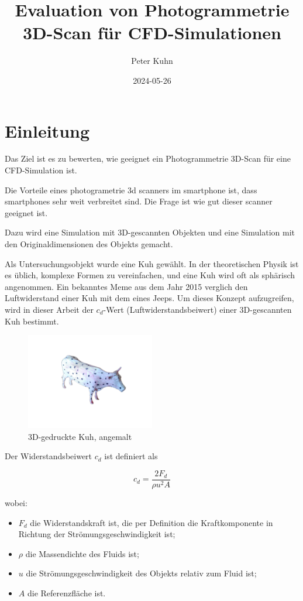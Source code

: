 \documentclass[a4paper,12pt]{article}
\title{Evaluation von Photogrammetrie 3D-Scan für CFD-Simulationen}
\author{Peter Kuhn}
\date{2024-05-26}
\begin{document}
\maketitle

\tableofcontents

\section{Einleitung}\label{sec:Einleitung}
Das Ziel ist es zu bewerten, wie geeignet ein Photogrammetrie 3D-Scan für eine CFD-Simulation ist.

Die Vorteile eines photogrametrie 3d scanners im smartphone ist, dass smartphones sehr weit verbreitet sind. Die Frage ist wie gut dieser scanner geeignet ist.

Dazu wird eine Simulation mit 3D-gescannten Objekten und eine Simulation mit den Originaldimensionen des Objekts gemacht.

Als Untersuchungsobjekt wurde eine Kuh gewählt. In der theoretischen Physik ist es üblich, komplexe Formen zu vereinfachen, und eine Kuh wird oft als sphärisch angenommen. Ein bekanntes Meme aus dem Jahr 2015 verglich den Luftwiderstand einer Kuh mit dem eines Jeeps. Um dieses Konzept aufzugreifen, wird in dieser Arbeit der \( c_d \)-Wert (Luftwiderstandsbeiwert) einer 3D-gescannten Kuh bestimmt.
\newpage

\begin{figure}[h]
    \centering
    \includegraphics[width=0.5\textwidth]{signal-2024-05-26-124612.png}
    \caption{3D-gedruckte Kuh, angemalt}
    \label{fig:cowObj}
\end{figure}

Der Widerstandsbeiwert \( c_d \) ist definiert als

\begin{equation}
c_d = \frac{2 F_d}{\rho u^2 A}
\end{equation}

wobei:
\begin{itemize}
    \item \( F_d \) die Widerstandskraft ist, die per Definition die Kraftkomponente in Richtung der Strömungsgeschwindigkeit ist;
    \item \( \rho \) die Massendichte des Fluids ist;
    \item \( u \) die Strömungsgeschwindigkeit des Objekts relativ zum Fluid ist;
    \item \( A \) die Referenzfläche ist.
\end{itemize}
\end{document}
